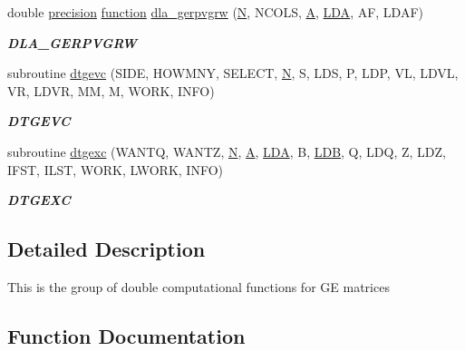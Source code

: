 \begin{DoxyCompactItemize}
double \hyperlink{numinquire_8h_a2c8e616467665d0b2814d4c1589ba74e}{precision} \hyperlink{afunc_8m_a7b5e596df91eadea6c537c0825e894a7}{function} \hyperlink{group__doubleGEcomputational_gae1378019437b04b2b46b5f7be3b5e175}{dla\+\_\+gerpvgrw} (\hyperlink{polmisc_8c_a0240ac851181b84ac374872dc5434ee4}{N}, N\+C\+O\+L\+S, \hyperlink{classA}{A}, \hyperlink{example__user_8c_ae946da542ce0db94dced19b2ecefd1aa}{L\+D\+A}, A\+F, L\+D\+A\+F)
\begin{DoxyCompactList}\small\item\em {\bfseries D\+L\+A\+\_\+\+G\+E\+R\+P\+V\+G\+R\+W} \end{DoxyCompactList}\item 
subroutine \hyperlink{group__doubleGEcomputational_ga60fe6f45ae036702cf7affea4f0de69c}{dtgevc} (S\+I\+D\+E, H\+O\+W\+M\+N\+Y, S\+E\+L\+E\+C\+T, \hyperlink{polmisc_8c_a0240ac851181b84ac374872dc5434ee4}{N}, S, L\+D\+S, P, L\+D\+P, V\+L, L\+D\+V\+L, V\+R, L\+D\+V\+R, M\+M, M, W\+O\+R\+K, I\+N\+F\+O)
\begin{DoxyCompactList}\small\item\em {\bfseries D\+T\+G\+E\+V\+C} \end{DoxyCompactList}\item 
subroutine \hyperlink{group__doubleGEcomputational_ga2510d68d70194719d570cbcfe24b3e74}{dtgexc} (W\+A\+N\+T\+Q, W\+A\+N\+T\+Z, \hyperlink{polmisc_8c_a0240ac851181b84ac374872dc5434ee4}{N}, \hyperlink{classA}{A}, \hyperlink{example__user_8c_ae946da542ce0db94dced19b2ecefd1aa}{L\+D\+A}, B, \hyperlink{example__user_8c_a50e90a7104df172b5a89a06c47fcca04}{L\+D\+B}, Q, L\+D\+Q, Z, L\+D\+Z, I\+F\+S\+T, I\+L\+S\+T, W\+O\+R\+K, L\+W\+O\+R\+K, I\+N\+F\+O)
\begin{DoxyCompactList}\small\item\em {\bfseries D\+T\+G\+E\+X\+C} \end{DoxyCompactList}\end{DoxyCompactItemize}


\subsection{Detailed Description}
This is the group of double computational functions for G\+E matrices 

\subsection{Function Documentation}
\hypertarget{group__doubleGEcomputational_ga486d8da01d3304d595dab4cef3353ce6}{}
